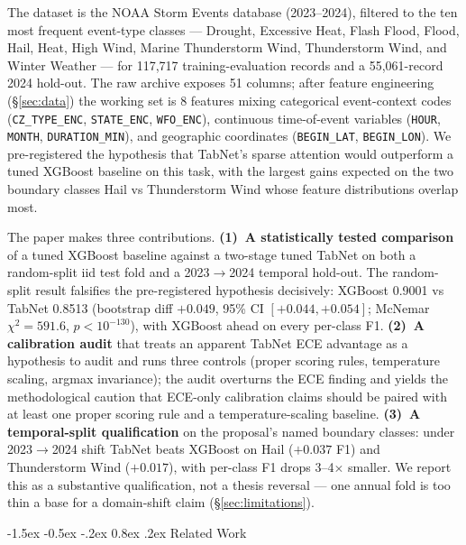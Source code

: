 \documentclass[11pt]{article}
\makeatletter
\renewcommand\section{\@startsection{section}{1}{\z@}%
  {-1.5ex \@plus -0.5ex \@minus -.2ex}%
  {0.8ex \@plus.2ex}%
  {\normalfont\large\bfseries}}
\makeatother
\begin{document}
The dataset is the NOAA Storm Events database (2023--2024), filtered
to the ten most frequent event-type classes --- Drought, Excessive
Heat, Flash Flood, Flood, Hail, Heat, High Wind, Marine Thunderstorm
Wind, Thunderstorm Wind, and Winter Weather --- for 117{,}717
training-evaluation records and a 55{,}061-record 2024 hold-out. The
raw archive exposes 51 columns; after feature engineering
(\S\ref{sec:data}) the working set is 8 features mixing categorical
event-context codes (\texttt{CZ\_TYPE\_ENC}, \texttt{STATE\_ENC},
\texttt{WFO\_ENC}), continuous time-of-event variables
(\texttt{HOUR}, \texttt{MONTH}, \texttt{DURATION\_MIN}), and
geographic coordinates (\texttt{BEGIN\_LAT}, \texttt{BEGIN\_LON}).
We pre-registered the hypothesis that TabNet's sparse attention
would outperform a tuned XGBoost baseline on this task, with the
largest gains expected on the two boundary classes Hail vs
Thunderstorm Wind whose feature distributions overlap most.

The paper makes three contributions.
\textbf{(1)~A statistically tested comparison} of a tuned XGBoost
baseline against a two-stage tuned TabNet on both a random-split
iid test fold and a 2023$\rightarrow$2024 temporal hold-out. The
random-split result falsifies the pre-registered hypothesis
decisively: XGBoost 0.9001 vs TabNet 0.8513 (bootstrap diff $+0.049$,
95\% CI $[+0.044, +0.054]$; McNemar $\chi^2 = 591.6$,
$p < 10^{-130}$), with XGBoost ahead on every per-class F1.
\textbf{(2)~A calibration audit} that treats an apparent
TabNet ECE advantage as a hypothesis to audit and runs three
controls (proper scoring rules, temperature scaling, argmax
invariance); the audit overturns the ECE finding and yields the
methodological caution that ECE-only calibration claims should be
paired with at least one proper scoring rule and a
temperature-scaling baseline.
\textbf{(3)~A temporal-split qualification} on the proposal's named
boundary classes: under 2023$\rightarrow$2024 shift TabNet beats
XGBoost on Hail ($+0.037$ F1) and Thunderstorm Wind ($+0.017$),
with per-class F1 drops 3--4$\times$ smaller. We report this as a
substantive qualification, not a thesis reversal --- one annual
fold is too thin a base for a domain-shift claim
(\S\ref{sec:limitations}).

\section{Related Work}\label{sec:relwork}
\end{document}
